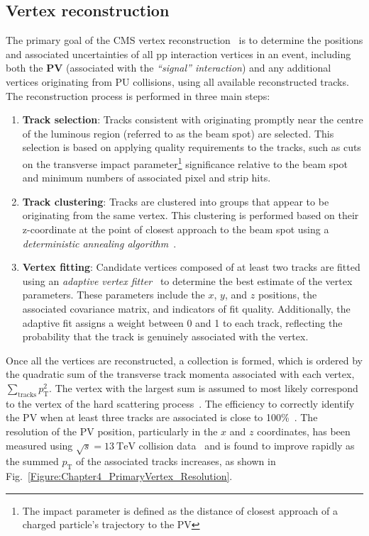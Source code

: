 \subsection{Vertex reconstruction}

The primary goal of the CMS vertex reconstruction~\cite{CMS_TrackerPerformance_2014} is to determine the positions and associated uncertainties of all pp interaction vertices in an event, including both the \textbf{\ac{PV}} (associated with the \textit{``signal'' interaction}) and any additional vertices originating from PU collisions, using all available reconstructed tracks. The reconstruction process is performed in three main steps: 

\begin{enumerate}
    \item \textbf{Track selection}: Tracks consistent with originating promptly near the centre of the luminous region (referred to as the beam spot) are selected. This selection is based on applying quality requirements to the tracks, such as cuts on the transverse impact parameter\footnote{The impact parameter is defined as the distance of closest approach of a charged particle’s trajectory to the PV} significance relative to the beam spot and minimum numbers of associated pixel and strip hits.
    \item \textbf{Track clustering}: Tracks are clustered into groups that appear to be originating from the same vertex. This clustering is performed based on their z-coordinate at the point of closest approach to the beam spot using a \textit{deterministic annealing algorithm}~\cite{DeterministicAnnealing}.
    \item \textbf{Vertex fitting}: Candidate vertices composed of at least two tracks are fitted using an \textit{adaptive vertex fitter}~\cite{VertexFitting_2006,VertexFitting_2007} to determine the best estimate of the vertex parameters. These parameters include the $x$, $y$, and $z$ positions, the associated covariance matrix, and indicators of fit quality. Additionally, the adaptive fit assigns a weight between 0 and 1 to each track, reflecting the probability that the track is genuinely associated with the vertex.
\end{enumerate}

Once all the vertices are reconstructed, a collection is formed, which is ordered by the quadratic sum of the transverse track momenta associated with each vertex, $\sum_{\text{tracks}} p_{\mathrm{T}}^2$. The vertex with the largest sum is assumed to most likely correspond to the vertex of the hard scattering process~\cite{ParticleFlow}. The efficiency to correctly identify the PV when at least three tracks are associated is close to 100\%~\cite{CMS_TrackerPerformance_2014}. The resolution of the PV position, particularly in the $x$ and $z$ coordinates, has been measured using $\sqrt{s} = 13\ \mathrm{TeV}$ collision data~\cite{PrimaryVertex_Resolution} and is found to improve rapidly as the summed $p_{\mathrm{T}}$ of the associated tracks increases, as shown in Fig.~\ref{Figure:Chapter4_PrimaryVertex_Resolution}.

